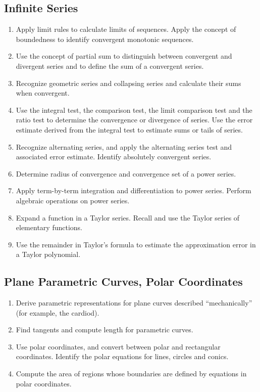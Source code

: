 \documentclass[11pt]{article}
\begin{document}
\subsection{Infinite Series}
  \begin{enumerate}
    \item Apply limit rules to calculate limits of sequences. Apply the concept
          of boundedness to identify convergent monotonic sequences.
    \item Use the concept of partial sum to distinguish between convergent and
          divergent series and to define the sum of a convergent series.
    \item Recognize geometric series and collapsing series and calculate their
          sums when convergent.
    \item Use the integral test, the comparison test, the limit comparison
          test and the ratio test to determine the convergence or divergence of
          series. Use the error estimate derived from the integral test to
          estimate sums or tails of series.
    \item Recognize alternating series, and apply the alternating series test
          and associated error estimate. Identify absolutely convergent series.
    \item Determine radius of convergence and convergence set of a power
          series. 
    \item Apply term-by-term integration and differentiation to power series.
          Perform algebraic operations on power series.
    \item Expand a function in a Taylor series. Recall and use the Taylor
          series of elementary functions.
    \item Use the remainder in Taylor's formula to estimate the approximation
          error in a Taylor polynomial.
  \end{enumerate}
\subsection{Plane Parametric Curves, Polar Coordinates}
  \begin{enumerate}
    \item Derive parametric representations for plane curves described
          ``mechanically'' (for example, the cardiod). 
    \item Find tangents and compute length for parametric curves.
    \item Use polar coordinates, and convert between polar and rectangular
          coordinates. Identify the polar equations for lines, circles and
          conics. 
    \item Compute the area of regions whose boundaries are defined by
          equations in polar coordinates.
  \end{enumerate}
\end{document}
